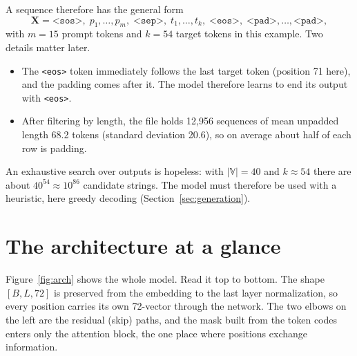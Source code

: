 \documentclass[11pt]{article}
\newcommand{\tok}[1]{\texttt{<#1>}}
\newcommand{\V}{\mathbb{V}}
\begin{document}
\noindent A sequence therefore has the general form
\begin{equation}
  \bm{X} = \tok{sos},\; p_1,\dots,p_m,\; \tok{sep},\; t_1,\dots,t_k,\; \tok{eos},\;
           \tok{pad},\dots,\tok{pad},
  \label{eq:layout}
\end{equation}
with $m=15$ prompt tokens and $k=54$ target tokens in this example. Two details
matter later.
\begin{itemize}
\item The \tok{eos} token immediately follows the last target token (position 71
  here), and the padding comes after it. The model therefore learns to end its output
  with \tok{eos}.
\item After filtering by length, the file holds 12{,}956 sequences of mean unpadded
  length 68.2 tokens (standard deviation 20.6), so on average about half of each row
  is padding.
\end{itemize}

An exhaustive search over outputs is hopeless: with $|\V|=40$ and $k\approx54$ there
are about $40^{54}\approx10^{86}$ candidate strings. The model must therefore be used
with a heuristic, here greedy decoding (Section~\ref{sec:generation}).

\section{The architecture at a glance}

Figure~\ref{fig:arch} shows the whole model. Read it top to bottom. The shape
$[B,L,72]$ is preserved from the embedding to the last layer normalization, so every
position carries its own 72-vector through the network. The two elbows on the left
are the residual (skip) paths, and the mask built from the token codes enters only
the attention block, the one place where positions exchange information.
\end{document}
